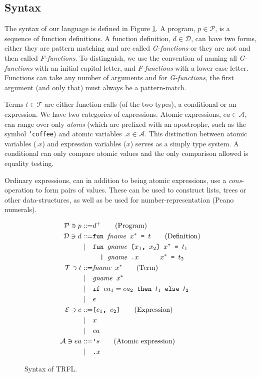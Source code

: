 \documentclass[10pt]{../sigplanconf}
\begin{document}
\subsection{Syntax}
The syntax of our language is defined in Figure \ref{fig:bnf}. A
program, $p \in \mathcal{P}$, is a sequence of function definitions. A
function definition, $d \in \mathcal{D}$, can have two forms, either
they are pattern matching and are called \textit{G-functions} or they
are not and then called \textit{F-functions}. To distinguish, we use
the convention of naming all \textit{G-functions} with an initial
capital letter, and \textit{F-functions} with a lower case
letter. Functions can take any number of arguments and for
\textit{G-functions}, the first argument (and only that) must always
be a pattern-match.

Terms $t \in \mathcal{T}$ are either function calls (of the two
types), a conditional or an expression. We have two categories of
expressions. Atomic expressions, $ea \in \mathcal{A}$, can range over
only \textit{atoms} (which are prefixed with an apostrophe, such as
the symbol \texttt{'coffee}) and atomic variables $\texttt{.}x \in
\mathcal{A}$. This distinction between atomic variables
($\texttt{.}x$) and expression variables ($x$) serves as a simply type
system. A conditional can only compare atomic values and the only
comparison allowed is equality testing.

Ordinary expressions, can in addition to being atomic expressions, use
a \textit{cons}-operation to form pairs of values. These can be used
to construct lists, trees or other data-structures, as well as be used
for number-representation (Peano numerals).

\begin{figure}\centering
  \begin{align*}
    \mathcal{P} \ni p ::= & d^{+}\tag{Program}\\
    \mathcal{D} \ni d ::= &\texttt{fun \textit{\rmfamily fname} $x^{*}$ = $t$}  \tag{Definition} \\
    | \quad &\texttt{fun \textit{\rmfamily gname} [$x_1$, $x_2$] $x^{*}$ = $t_1$} \\
    & \texttt{\ \ | \textit{\rmfamily gname}\ \texttt{.}$x$ \hspace{.7cm} $x^{*}$ = $t_2$}\\
    \mathcal{T} \ni t ::= & \texttt{\textit{\rmfamily fname} $x^{*}$}  \tag{Term}\\
    | \quad & \texttt{\textit{\rmfamily gname} $x^{*}$} \\
    | \quad & \texttt{if $ea_1 = ea_2$ then $t_1$ else $t_2$} \\
    | \quad & e \\
    \mathcal{E} \ni e ::= & \texttt{[$e_1$, $e_2$]} \tag{Expression}\\
    | \quad & x \\
    | \quad & ea \\
    \mathcal{A} \ni ea ::= & \texttt{'}s \tag{Atomic expression}\\
    | \quad & \texttt{.}x
  \end{align*}
  \caption{Syntax of TRFL.}
\label{fig:bnf}
\end{figure}
\end{document}
